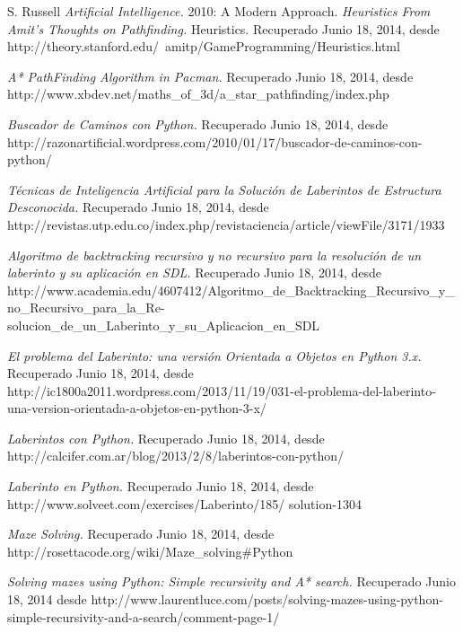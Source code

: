 \documentclass[letter, titlepage, 10pt]{article}
\begin{document}
\begin{thebibliography}{10} %
     S. Russell {\em Artificial Intelligence.} 2010: A Modern Approach.
     {\em Heuristics From Amit's Thoughts on Pathfinding.} Heuristics. Recuperado Junio 18, 2014, desde http://theory.stanford.edu/~amitp/GameProgramming/Heuristics.html
    
     {\em A* PathFinding Algorithm in Pacman.} Recuperado Junio 18, 2014, desde http://www.xbdev.net/maths\_of\_3d/a\_star\_pathfinding/index.php
    
     {\em Buscador de Caminos con Python.} Recuperado Junio 18, 2014, desde http://razonartificial.wordpress.com/2010/01/17/buscador-de-caminos-con-python/
    
     {\em Técnicas de Inteligencia Artificial para la Solución de Laberintos de Estructura Desconocida.} Recuperado Junio 18, 2014, desde http://revistas.utp.edu.co/index.php/revistaciencia/article/viewFile/3171/1933
    
     {\em  Algoritmo de backtracking recursivo y no recursivo para la resolución de un laberinto y su aplicación en SDL.} Recuperado Junio 18, 2014, desde http://www.academia.edu/4607412/Algoritmo\_de\_Backtracking\_Recursivo\_y\_no\_Recursivo\_para\_la\_Re-solucion\_de\_un\_Laberinto\_y\_su\_Aplicacion\_en\_SDL
    
     {\em El problema del Laberinto: una versión Orientada a Objetos en Python 3.x.} Recuperado Junio 18, 2014, desde http://ic1800a2011.wordpress.com/2013/11/19/031-el-problema-del-laberinto-una-version-orientada-a-objetos-en-python-3-x/
    
     {\em Laberintos con Python.} Recuperado Junio 18, 2014, desde http://calcifer.com.ar/blog/2013/2/8/laberintos-con-python/
    
     {\em Laberinto en Python.} Recuperado Junio 18, 2014, desde http://www.solveet.com/exercises/Laberinto/185/ solution-1304

     {\em Maze Solving.} Recuperado Junio 18, 2014, desde http://rosettacode.org/wiki/Maze\_solving\#Python

     {\em Solving mazes using Python: Simple recursivity and A* search.} Recuperado Junio 18, 2014 desde http://www.laurentluce.com/posts/solving-mazes-using-python-simple-recursivity-and-a-search/comment-page-1/


\end{thebibliography}
\end{document}
